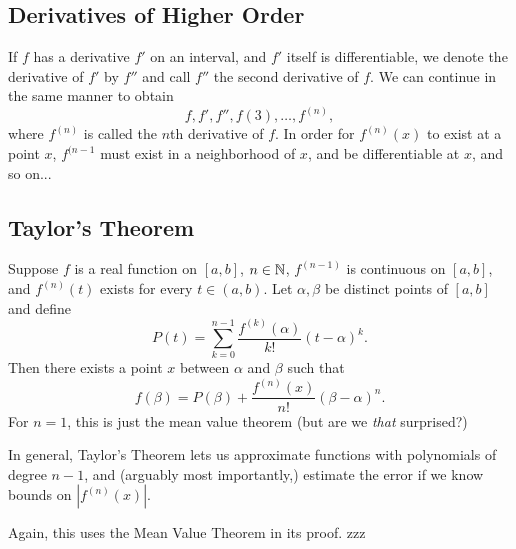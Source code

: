 \documentclass{article}
\begin{document}
\subsection{Derivatives of Higher Order}
\begin{definition}
    If $f$ has a derivative $f'$ on an interval, and $f'$ itself is differentiable, we denote the derivative of $f'$ by $f''$ and call $f''$ the second derivative of $f$. We can continue in the same manner to obtain \[f,f',f'',f(3),\dotsc,f^{(n)},\]where $f^{(n)}$ is called the $n$th derivative of $f$. In order for $f^{(n)}(x)$ to exist at a point $x$, $f^{(n-1}$ must exist in a neighborhood of $x$, and be differentiable at $x$, and so on...
\end{definition}
\subsection{Taylor's Theorem}
\begin{theorem}
    Suppose $f$ is a real function on $[a,b]$, $n\in\mathbb N$, $f^{(n-1)}$ is continuous on $[a,b]$, and $f^{(n)}(t)$ exists for every $t\in(a,b)$. Let $\alpha,\beta$ be distinct points of $[a,b]$ and define\[P(t)=\sum_{k=0}^{n-1}\frac{f^{(k)}(\alpha)}{k!}(t-\alpha)^{k}.\]Then there exists a point $x$ between $\alpha$ and $\beta$ such that \[f(\beta)=P(\beta)+\frac{f^{(n)}(x)}{n!}(\beta-\alpha)^{n}.\]For $n=1$, this is just the mean value theorem (but are we \textit{that} surprised?)
\end{theorem}
In general, Taylor's Theorem lets us approximate functions with polynomials of degree $n-1$, and (arguably most importantly,) estimate the error if we know bounds on $|f^{(n)}(x)|.$
\begin{remark}
    Again, this uses the Mean Value Theorem in its proof. zzz
\end{remark}
\end{document}
